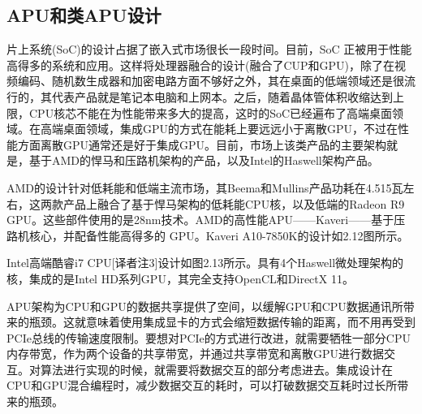 \subsection{APU和类APU设计}

片上系统(SoC)的设计占据了嵌入式市场很长一段时间。目前，SoC 正被用于性能高得多的系统和应用。这样将处理器融合的设计(融合了CUP和GPU)，除了在视频编码、随机数生成器和加密电路方面不够好之外，其在桌面的低端领域还是很流行的，其代表产品就是笔记本电脑和上网本。之后，随着晶体管体积收缩达到上限，CPU核芯不能在为性能带来多大的提高，这时的SoC已经遍布了高端桌面领域。在高端桌面领域，集成GPU的方式在能耗上要远远小于离散GPU，不过在性能方面离散GPU通常还是好于集成GPU。目前，市场上该类产品的主要架构就是，基于AMD的悍马和压路机架构的产品，以及Intel的Haswell架构产品。

AMD的设计针对低耗能和低端主流市场，其Beema和Mullins产品功耗在4.515瓦左右，这两款产品上融合了基于悍马架构的低耗能CPU核，以及低端的Radeon R9 GPU。这些部件使用的是28nm技术。AMD的高性能APU——Kaveri——基于压路机核心，并配备性能高得多的 GPU。Kaveri A10-7850K的设计如2.12图所示。


Intel高端酷睿i7 CPU[译者注3]设计如图2.13所示。具有4个Haswell微处理架构的核，集成的是Intel HD系列GPU，其完全支持OpenCL和DirectX 11。


APU架构为CPU和GPU的数据共享提供了空间，以缓解GPU和CPU数据通讯所带来的瓶颈。这就意味着使用集成显卡的方式会缩短数据传输的距离，而不用再受到PCIe总线的传输速度限制。要想对PCIe的方式进行改进，就需要牺牲一部分CPU内存带宽，作为两个设备的共享带宽，并通过共享带宽和离散GPU进行数据交互。对算法进行实现的时候，就需要将数据交互的部分考虑进去。集成设计在CPU和GPU混合编程时，减少数据交互的耗时，可以打破数据交互耗时过长所带来的瓶颈。

\myRefRule

